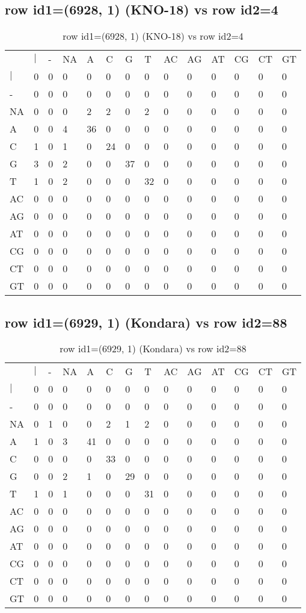 \subsection{row id1=(6928, 1) (KNO-18) vs row id2=4}
\begin{center}
\begin{longtable}{|l|l|l|l|l|l|l|l|l|l|l|l|l|l|}
\caption{row id1=(6928, 1) (KNO-18) vs row id2=4} \label{table_dm118}\\
\hline
\\
\hline
&$|$&-&NA&A&C&G&T&AC&AG&AT&CG&CT&GT\\
$|$&0&0&0&0&0&0&0&0&0&0&0&0&0\\
-&0&0&0&0&0&0&0&0&0&0&0&0&0\\
NA&0&0&0&2&2&0&2&0&0&0&0&0&0\\
A&0&0&4&36&0&0&0&0&0&0&0&0&0\\
C&1&0&1&0&24&0&0&0&0&0&0&0&0\\
G&3&0&2&0&0&37&0&0&0&0&0&0&0\\
T&1&0&2&0&0&0&32&0&0&0&0&0&0\\
AC&0&0&0&0&0&0&0&0&0&0&0&0&0\\
AG&0&0&0&0&0&0&0&0&0&0&0&0&0\\
AT&0&0&0&0&0&0&0&0&0&0&0&0&0\\
CG&0&0&0&0&0&0&0&0&0&0&0&0&0\\
CT&0&0&0&0&0&0&0&0&0&0&0&0&0\\
GT&0&0&0&0&0&0&0&0&0&0&0&0&0\\
\hline
\end{longtable}
\end{center}

\subsection{row id1=(6929, 1) (Kondara) vs row id2=88}
\begin{center}
\begin{longtable}{|l|l|l|l|l|l|l|l|l|l|l|l|l|l|}
\caption{row id1=(6929, 1) (Kondara) vs row id2=88} \label{table_dm120}\\
\hline
\\
\hline
&$|$&-&NA&A&C&G&T&AC&AG&AT&CG&CT&GT\\
$|$&0&0&0&0&0&0&0&0&0&0&0&0&0\\
-&0&0&0&0&0&0&0&0&0&0&0&0&0\\
NA&0&1&0&0&2&1&2&0&0&0&0&0&0\\
A&1&0&3&41&0&0&0&0&0&0&0&0&0\\
C&0&0&0&0&33&0&0&0&0&0&0&0&0\\
G&0&0&2&1&0&29&0&0&0&0&0&0&0\\
T&1&0&1&0&0&0&31&0&0&0&0&0&0\\
AC&0&0&0&0&0&0&0&0&0&0&0&0&0\\
AG&0&0&0&0&0&0&0&0&0&0&0&0&0\\
AT&0&0&0&0&0&0&0&0&0&0&0&0&0\\
CG&0&0&0&0&0&0&0&0&0&0&0&0&0\\
CT&0&0&0&0&0&0&0&0&0&0&0&0&0\\
GT&0&0&0&0&0&0&0&0&0&0&0&0&0\\
\hline
\end{longtable}
\end{center}

